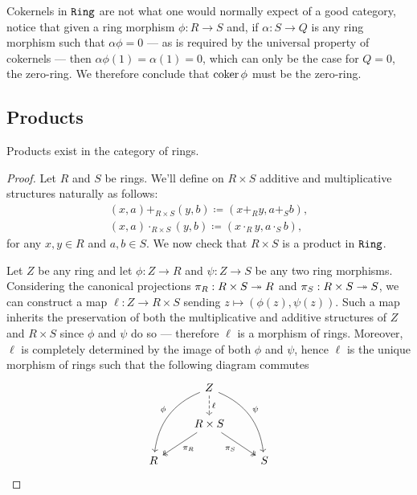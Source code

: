 \begin{remark}
    \label{rem:cokernel-in-ring}
    Cokernels in \({\texttt{Ring}}\) are not what one would normally expect of a good category,
    notice that given a ring morphism \(\phi: R \to S\) and, if \(\alpha: S \to Q\)
    is any ring morphism such that \(\alpha \phi = 0\) --- as is required by the
    universal property of cokernels --- then \(\alpha\phi(1) = \alpha(1) = 0\),
    which can only be the case for \(Q = 0\), the zero-ring. We therefore conclude
    that \(\operatorname{coker} \phi\) must be the zero-ring.
\end{remark}

\subsection{Products}

%
\begin{proposition}[Product]
    \label{prop:product-ring}
    Products exist in the category of rings.
\end{proposition}
%

%
\begin{proof}
    Let \(R\) and \(S\) be rings. We'll define on \(R \times S\) additive and
    multiplicative structures naturally as follows:
    \begin{gather*}
        (x, a) +_{R \times S} (y, b)     \coloneq (x +_R y, a +_S b), \\
        (x, a) \cdot_{R \times S} (y, b) \coloneq (x \cdot_R y, a \cdot_S b),
    \end{gather*}
    for any \(x, y \in R\) and \(a, b \in S\). We now check that \(R \times S\) is a
    product in \({\texttt{Ring}}\).

    Let \(Z\) be any ring and let \(\phi: Z \to R\) and \(\psi: Z \to S\) be any two
    ring morphisms. Considering the canonical projections \(\pi_R: R \times S \twoheadrightarrow
    R\) and \(\pi_S: R \times S \twoheadrightarrow S\), we can construct a map \(\ell: Z \to R
    \times S\) sending \(z \mapsto (\phi(z), \psi(z))\). Such a map inherits the
    preservation of both the multiplicative and additive structures of \(Z\) and \(R
    \times S\) since \(\phi\) and \(\psi\) do so --- therefore \(\ell\) is a
    morphism of rings. Moreover, \(\ell\) is completely determined by the image of
    both \(\phi\) and \(\psi\), hence \(\ell\) is the unique morphism of rings such
    that the following diagram commutes
    \[
        \begin{tikzcd}
            &Z \ar[ddl, bend right, swap, "\phi"]
            \ar[ddr, bend left, "\psi"]
            \ar[d, dashed, "\ell"] & \\
            &R \times S \ar[ld, two heads, "\pi_R"]
            \ar[rd, two heads, swap, "\pi_S"] &\\
            R & &S
        \end{tikzcd}
    \]
\end{proof}
%

